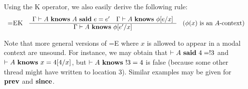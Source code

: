 Using  the {\sc K} operator, we also easily derive the following rule:
%
\[
\begin{array}{ccc}
\mbox{\sc =EK}
&
\begin{array}{c}
\Gamma\vdash A\ \Knows\ A\ \Says\ e = e' \hspace*{1em}  \Gamma \vdash A\ \Knows\ \phi[e/x] \\ \hline
\Gamma \vdash A\ \Knows\ \phi[e'/x]
\end{array}
&
(\phi(x)\ \mbox{is an $A$-context})
\end{array}
\]

Note that more general versions of {\sc =E} where $x$ is allowed to appear in a modal context are unsound. For instance, we may obtain that $\vdash A\ \mathbf{said}\ 4=!3$ and
$\vdash A\ \mathbf{knows}\ x=4[4/x]$, but $\vdash A\ \mathbf{knows}\ !3 = 4$ is false (because some other thread might have written to location 3). Similar examples may be given
for $\mathbf{prev}$ and $\mathbf{since}$.
%


